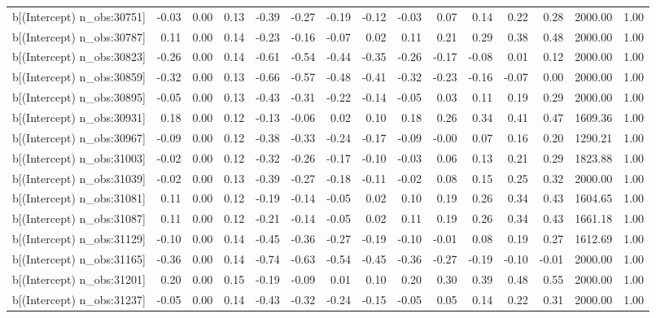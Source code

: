 \begin{table}[ht]
\begin{tabular}{rrrrrrrrrrrrrrr}
  b[(Intercept) n\_obs:30751] & -0.03 & 0.00 & 0.13 & -0.39 & -0.27 & -0.19 & -0.12 & -0.03 & 0.07 & 0.14 & 0.22 & 0.28 & 2000.00 & 1.00 \\ 
  b[(Intercept) n\_obs:30787] & 0.11 & 0.00 & 0.14 & -0.23 & -0.16 & -0.07 & 0.02 & 0.11 & 0.21 & 0.29 & 0.38 & 0.48 & 2000.00 & 1.00 \\ 
  b[(Intercept) n\_obs:30823] & -0.26 & 0.00 & 0.14 & -0.61 & -0.54 & -0.44 & -0.35 & -0.26 & -0.17 & -0.08 & 0.01 & 0.12 & 2000.00 & 1.00 \\ 
  b[(Intercept) n\_obs:30859] & -0.32 & 0.00 & 0.13 & -0.66 & -0.57 & -0.48 & -0.41 & -0.32 & -0.23 & -0.16 & -0.07 & 0.00 & 2000.00 & 1.00 \\ 
  b[(Intercept) n\_obs:30895] & -0.05 & 0.00 & 0.13 & -0.43 & -0.31 & -0.22 & -0.14 & -0.05 & 0.03 & 0.11 & 0.19 & 0.29 & 2000.00 & 1.00 \\ 
  b[(Intercept) n\_obs:30931] & 0.18 & 0.00 & 0.12 & -0.13 & -0.06 & 0.02 & 0.10 & 0.18 & 0.26 & 0.34 & 0.41 & 0.47 & 1609.36 & 1.00 \\ 
  b[(Intercept) n\_obs:30967] & -0.09 & 0.00 & 0.12 & -0.38 & -0.33 & -0.24 & -0.17 & -0.09 & -0.00 & 0.07 & 0.16 & 0.20 & 1290.21 & 1.00 \\ 
  b[(Intercept) n\_obs:31003] & -0.02 & 0.00 & 0.12 & -0.32 & -0.26 & -0.17 & -0.10 & -0.03 & 0.06 & 0.13 & 0.21 & 0.29 & 1823.88 & 1.00 \\ 
  b[(Intercept) n\_obs:31039] & -0.02 & 0.00 & 0.13 & -0.39 & -0.27 & -0.18 & -0.11 & -0.02 & 0.08 & 0.15 & 0.25 & 0.32 & 2000.00 & 1.00 \\ 
  b[(Intercept) n\_obs:31081] & 0.11 & 0.00 & 0.12 & -0.19 & -0.14 & -0.05 & 0.02 & 0.10 & 0.19 & 0.26 & 0.34 & 0.43 & 1604.65 & 1.00 \\ 
  b[(Intercept) n\_obs:31087] & 0.11 & 0.00 & 0.12 & -0.21 & -0.14 & -0.05 & 0.02 & 0.11 & 0.19 & 0.26 & 0.34 & 0.43 & 1661.18 & 1.00 \\ 
  b[(Intercept) n\_obs:31129] & -0.10 & 0.00 & 0.14 & -0.45 & -0.36 & -0.27 & -0.19 & -0.10 & -0.01 & 0.08 & 0.19 & 0.27 & 1612.69 & 1.00 \\ 
  b[(Intercept) n\_obs:31165] & -0.36 & 0.00 & 0.14 & -0.74 & -0.63 & -0.54 & -0.45 & -0.36 & -0.27 & -0.19 & -0.10 & -0.01 & 2000.00 & 1.00 \\ 
  b[(Intercept) n\_obs:31201] & 0.20 & 0.00 & 0.15 & -0.19 & -0.09 & 0.01 & 0.10 & 0.20 & 0.30 & 0.39 & 0.48 & 0.55 & 2000.00 & 1.00 \\ 
  b[(Intercept) n\_obs:31237] & -0.05 & 0.00 & 0.14 & -0.43 & -0.32 & -0.24 & -0.15 & -0.05 & 0.05 & 0.14 & 0.22 & 0.31 & 2000.00 & 1.00 \\ 

\end{tabular}
\end{table}
